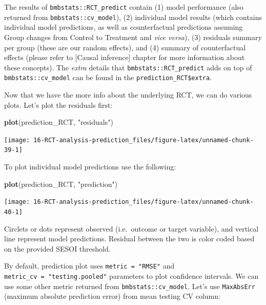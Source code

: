 \documentclass[
]{book}
\newenvironment{Shaded}{\begin{snugshade}}{\end{snugshade}}
\newcommand{\KeywordTok}[1]{\textcolor[rgb]{0.13,0.29,0.53}{\textbf{#1}}}
\newcommand{\NormalTok}[1]{#1}
\newcommand{\StringTok}[1]{\textcolor[rgb]{0.31,0.60,0.02}{#1}}
\begin{document}
The results of \texttt{bmbstats::RCT\_predict} contain (1) model performance (also returned from \texttt{bmbstats::cv\_model}), (2) individual model results (which contains individual model predictions, as well as counterfactual predictions assuming Group changes from Control to Treatment and \emph{vice versa}), (3) residuals summary per group (these are our random effects), and (4) summary of counterfactual effects (please refer to {[}Causal inference{]} chapter for more information about these concepts). The \emph{extra} details that \texttt{bmbstats::RCT\_predict} adds on top of \texttt{bmbstats::cv\_model} can be found in the \texttt{prediction\_RCT\$extra}.

Now that we have the more info about the underlying RCT, we can do various plots. Let's plot the residuals first:

\begin{Shaded}
\begin{Highlighting}[]
\KeywordTok{plot}\NormalTok{(prediction\_RCT, }\StringTok{"residuals"}\NormalTok{)}
\end{Highlighting}
\end{Shaded}

\begin{center}\texttt{[image: 16-RCT-analysis-prediction\_files/figure-latex/unnamed-chunk-39-1]} \end{center}

To plot individual model predictions use the following:

\begin{Shaded}
\begin{Highlighting}[]
\KeywordTok{plot}\NormalTok{(prediction\_RCT, }\StringTok{"prediction"}\NormalTok{)}
\end{Highlighting}
\end{Shaded}

\begin{center}\texttt{[image: 16-RCT-analysis-prediction\_files/figure-latex/unnamed-chunk-40-1]} \end{center}

Circlets or dots represent observed (i.e.~outcome or target variable), and vertical line represent model predictions. Residual between the two is color coded based on the provided SESOI threshold.

By default, prediction plot uses \texttt{metric\ =\ "RMSE"} and \texttt{metric\_cv\ =\ "testing.pooled"} parameters to plot confidence intervals. We can use some other metric returned from \texttt{bmbstats::cv\_model}. Let's use \texttt{MaxAbsErr} (maximum absolute prediction error) from mean testing CV column:
\end{document}

